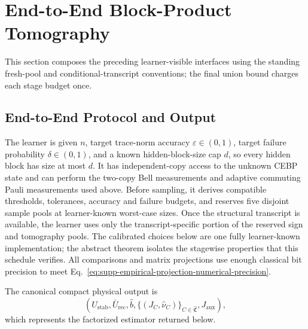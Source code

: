 \documentclass[
  aps,
  prx,
  reprint,
  superscriptaddress,
  amsmath,
  amssymb,
  nofootinbib,
  longbibliography
]{revtex4-2}
\begin{document}
\section{End-to-End Block-Product Tomography}
\label{sec:supp-end-to-end}

This section composes the preceding learner-visible interfaces using the
standing fresh-pool and conditional-transcript conventions; the final union
bound charges each stage budget once.

\subsection{End-to-End Protocol and Output}

The learner is given \(n\), target trace-norm accuracy
\(\varepsilon\in(0,1)\), target failure probability
\(\delta\in(0,1)\), and a known hidden-block-size cap \(d\), so every hidden
block has size at most \(d\).  It has independent-copy access to the unknown
CEBP state and can perform the two-copy Bell measurements and adaptive
commuting Pauli measurements used above.  Before sampling, it derives
compatible thresholds, tolerances, accuracy and failure budgets, and
reserves five disjoint sample pools at learner-known worst-case sizes.  Once
the structural transcript is available, the learner uses only the
transcript-specific portion of the reserved sign and tomography pools.  The
calibrated choices below are one fully learner-known implementation; the
abstract theorem isolates the stagewise properties that this schedule
verifies.  All comparisons and matrix projections use enough classical bit
precision to meet
Eq.~\eqref{eq:supp-empirical-projection-numerical-precision}.

The canonical compact physical output is
\begin{equation}
\left(
U_{\mathrm{stab}},
\bar U_{\mathrm{rec}},
\widehat b,
\{(J_C,\widehat\nu_C)\}_{C\in\widehat{\mathfrak C}},
J_{\mathrm{aux}}
\right),
\label{eq:supp-abstract-output-tuple}
\end{equation}
which represents the factorized estimator returned below.
\end{document}
